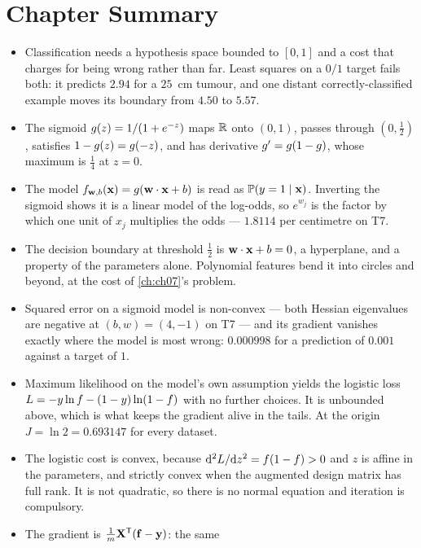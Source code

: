 \section*{Chapter Summary}

\begin{itemize}
  \item Classification needs a hypothesis space bounded to $[0,1]$ and a cost
        that charges for being wrong rather than far. Least squares on a $0/1$
        target fails both: it predicts $2.94$ for a $25$~cm tumour, and one
        distant correctly-classified example moves its boundary from $4.50$ to
        $5.57$.
  \item The sigmoid $g(z) = 1/(1+e^{-z})$ maps $\mathbb{R}$ onto $(0,1)$, passes
        through $(0,\tfrac12)$, satisfies $1-g(z) = g(-z)$, and has
        derivative $g' = g(1-g)$, whose maximum is $\tfrac14$ at
        $z=0$.
  \item The model $f_{\mathbf{w},b}(\mathbf{x}) = g(\mathbf{w}\cdot\mathbf{x}+b)$ is read as
        $\mathbb{P}(y=1\mid\mathbf{x})$. Inverting the sigmoid shows it is a linear model of
        the log-odds, so $e^{w_j}$ is the factor by which one unit of $x_j$
        multiplies the odds --- $1.8114$ per centimetre on T7.
  \item The decision boundary at threshold $\tfrac12$ is $\mathbf{w}\cdot\mathbf{x} + b = 0$,
        a hyperplane, and a property of the parameters alone. Polynomial
        features bend it into circles and beyond, at the cost of
        \cref{ch:ch07}'s problem.
  \item Squared error on a sigmoid model is non-convex --- both Hessian
        eigenvalues are negative at $(b,w) = (4,-1)$ on T7 --- and its gradient
        vanishes exactly where the model is most wrong: $0.000998$ for a
        prediction of $0.001$ against a target of $1$.
  \item Maximum likelihood on the model's own assumption yields the logistic
        loss $L = -y\ln f - (1-y)\ln(1-f)$ with no further choices. It is
        unbounded above, which is what keeps the gradient alive in the tails.
        At the origin $J = \ln 2 = 0.693147$ for every dataset.
  \item The logistic cost is convex, because $\mathrm{d}^2L/\mathrm{d} z^2 = f(1-f) > 0$
        and $z$ is affine in the parameters, and strictly convex when the
        augmented design matrix has full rank. It is not quadratic, so there is
        no normal equation and iteration is compulsory.
  \item The gradient is $\frac1m\mathbf{X}^{\mathsf{T}}(\mathbf{f}-\mathbf{y})$: the same

\end{itemize}
